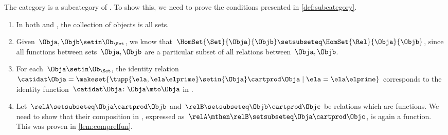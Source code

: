 \begin{example}
    The category \Set is a subcategory of \Rel.
    To show this, we need to prove the conditions presented in \cref{def:subcategory}.
    \begin{enumerate}
        \item In both \Rel and \Set, the collection of objects is all sets.
        \item Given~$\Obja,\Objb\setin \Ob_{\Set}$, we know that~$\HomSet{\Set}{\Obja}{\Objb}\setsubseteq \HomSet{\Rel}{\Obja}{\Objb}$, since all functions between sets~$\Obja,\Objb$ are a particular subset of all relations between~$\Obja,\Objb$.
        \item For each~$\Obja \setin \Ob_{\Set}$, the identity relation~$\catidat\Obja=\makeset{\tupp{\ela,\ela\elprime}\setin {\Obja} \cartprod \Obja \mid \ela=\ela\elprime}$ corresponds to the identity function~$\catidat\Obja \colon \Obja \mto \Obja$ in \Set.
        \item Let~$\relA\setsubseteq \Obja\cartprod \Objb$ and~$\relB\setsubseteq \Objb \cartprod \Objc$ be relations which are functions.
              We need to show that their composition in \Rel, expressed as~$\relA\mthen \relB\setsubseteq \Obja\cartprod \Objc$, is again a function.
              This was proven in \cref{lem:comprelfun}.
    \end{enumerate}
\end{example}
